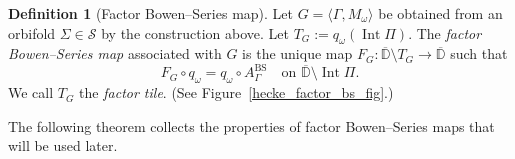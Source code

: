 \documentclass[11pt,a4paper, oneside]{amsart}
\theoremstyle{definition}
\newtheorem{defn}[thm]{Definition}
\theoremstyle{remark}
\numberwithin{equation}{section}
\def\D{{\mathbb{D}}}
\begin{document}
\begin{defn}[Factor Bowen--Series map]
	\label{Def:FactorBowenSeries}
	Let $G=\langle \Gamma,M_\omega\rangle$ be obtained from an orbifold
	$\Sigma\in\mathscr S$ by the construction above. Let
	$
	T_G:=q_\omega(\operatorname{Int}\Pi).
	$
	The \emph{factor Bowen--Series map} associated with $G$ is the unique map
	$
	F_G:\overline{\D}\setminus T_G\longrightarrow\overline{\D}
	$
	such that
	\[
	F_G\circ q_\omega
	=
	q_\omega\circ A^{\mathrm{BS}}_\Gamma
	\quad
	\text{on }
	\overline{\D}\setminus \operatorname{Int}\Pi.
	\]
	We call $T_G$ the \emph{factor tile}.  (See Figure~\ref{hecke_factor_bs_fig}.)
\end{defn}

The following theorem collects the properties of factor Bowen--Series maps that
will be used later.
\end{document}
